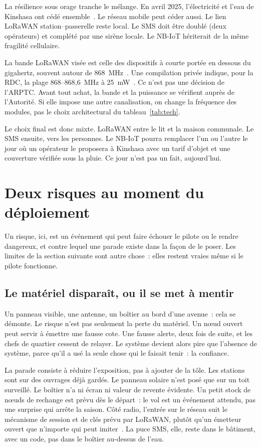 \documentclass[12pt,a4paper]{article}
\begin{document}
La résilience sous orage tranche le mélange. En avril 2025, l'électricité et l'eau de Kinshasa ont cédé ensemble~\cite{ifrc2025}. Le réseau mobile peut céder aussi. Le lien LoRaWAN station--passerelle reste local. Le SMS doit être doublé (deux opérateurs) et complété par une sirène locale. Le NB-IoT hériterait de la même fragilité cellulaire.

La bande LoRaWAN visée est celle des dispositifs à courte portée en dessous du gigahertz, souvent autour de 868~MHz~\cite{uit2018}. Une compilation privée indique, pour la RDC, la plage 868--868,6~MHz à 25~mW~\cite{eleos}. Ce n'est pas une décision de l'ARPTC. Avant tout achat, la bande et la puissance se vérifient auprès de l'Autorité. Si elle impose une autre canalisation, on change la fréquence des modules, pas le choix architectural du tableau~\ref{tab:tech}.

Le choix final est donc mixte. LoRaWAN entre le lit et la maison communale. Le SMS ensuite, vers les personnes. Le NB-IoT pourra remplacer l'un ou l'autre le jour où un opérateur le proposera à Kinshasa avec un tarif d'objet et une couverture vérifiée sous la pluie. Ce jour n'est pas un fait, aujourd'hui.

\section{Deux risques au moment du déploiement}
\label{sec:risques}

Un risque, ici, est un événement qui peut faire échouer le pilote ou le rendre dangereux, et contre lequel une parade existe dans la façon de le poser. Les limites de la section suivante sont autre chose~: elles restent vraies même si le pilote fonctionne.

\subsection{Le matériel disparaît, ou il se met à mentir}

Un panneau visible, une antenne, un boîtier au bord d'une avenue~: cela se démonte. Le risque n'est pas seulement la perte du matériel. Un nœud ouvert peut servir à émettre une fausse cote. Une fausse alerte, deux fois de suite, et les chefs de quartier cessent de relayer. Le système devient alors pire que l'absence de système, parce qu'il a usé la seule chose qui le faisait tenir~: la confiance.

La parade consiste à réduire l'exposition, pas à ajouter de la tôle. Les stations sont sur des ouvrages déjà gardés. Le panneau solaire n'est posé que sur un toit surveillé. Le boîtier n'a ni écran ni valeur de revente évidente. Un petit stock de nœuds de rechange est prévu dès le départ~: le vol est un événement attendu, pas une surprise qui arrête la saison. Côté radio, l'entrée sur le réseau suit le mécanisme de session et de clés prévu par LoRaWAN, plutôt qu'un émetteur ouvert que n'importe qui peut imiter~\cite{lora}. La puce SMS, elle, reste dans le bâtiment, avec un code, pas dans le boîtier au-dessus de l'eau.
\end{document}
